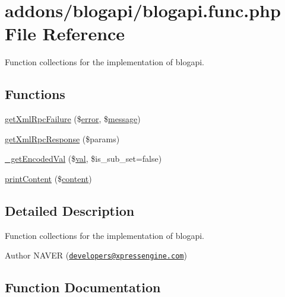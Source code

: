 \hypertarget{blogapi_8func_8php}{}\section{addons/blogapi/blogapi.func.\+php File Reference}
\label{blogapi_8func_8php}


Function collections for the implementation of blogapi.  


\subsection*{Functions}
\begin{DoxyCompactItemize}
\item 
\hyperlink{blogapi_8func_8php_a7e46f8d2f9b3c3115d176926b68b6b09}{get\+Xml\+Rpc\+Failure} (\$\hyperlink{jquery_8js_ad9c7b7332a24ed93fb21cd053c99bd12}{error}, \$\hyperlink{classmessage}{message})
\item 
\hyperlink{blogapi_8func_8php_a18b93e72ecaae5fdfcfe1f0f107238f6}{get\+Xml\+Rpc\+Response} (\$params)
\item 
\hyperlink{blogapi_8func_8php_a1557492ae9fc007747ea06aad32948a0}{\+\_\+get\+Encoded\+Val} (\$\hyperlink{ckeditor_2js_2xe__interface_8js_a4fb96abdf073a439bca5e051c333b35d}{val}, \$is\+\_\+sub\+\_\+set=false)
\item 
\hyperlink{blogapi_8func_8php_aee14687cb1bc033360baef8b634ab27e}{print\+Content} (\$\hyperlink{classcontent}{content})
\end{DoxyCompactItemize}


\subsection{Detailed Description}
Function collections for the implementation of blogapi. 

\begin{DoxyAuthor}{Author}
N\+A\+V\+ER (\href{mailto:developers@xpressengine.com}{\tt developers@xpressengine.\+com}) 
\end{DoxyAuthor}


\subsection{Function Documentation}
